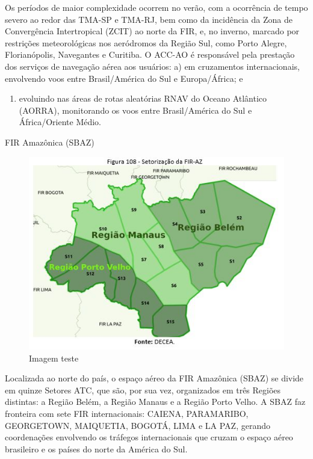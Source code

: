\documentclass[
]{book}
\providecommand{\tightlist}{%
  \setlength{\itemsep}{0pt}\setlength{\parskip}{0pt}}
\begin{document}
Os períodos de maior complexidade ocorrem no verão, com a ocorrência de tempo severo ao redor das TMA-SP e TMA-RJ, bem como da incidência da Zona de Convergência Intertropical (ZCIT) ao norte da FIR, e, no inverno, marcado por restrições meteorológicas nos aeródromos da Região Sul, como Porto Alegre, Florianópolis, Navegantes e Curitiba. O ACC-AO é responsável pela prestação dos serviços de navegação aérea aos usuários:
a) em cruzamentos internacionais, envolvendo voos entre Brasil/América do Sul e Europa/África; e

\begin{enumerate}
\def\labelenumi{\alph{enumi})}
\setcounter{enumi}{1}
\tightlist
\item
  evoluindo nas áreas de rotas aleatórias RNAV do Oceano Atlântico (AORRA), monitorando os voos entre Brasil/América do Sul e África/Oriente Médio.
\end{enumerate}

FIR Amazônica (SBAZ)

\begin{figure}
\centering
\includegraphics{imagens/fig100.jpg}
\caption{Imagem teste}
\end{figure}

Localizada ao norte do país, o espaço aéreo da FIR Amazônica (SBAZ) se divide em quinze Setores ATC, que são, por sua vez, organizados em três Regiões distintas: a Região Belém, a Região Manaus e a Região Porto Velho. A SBAZ faz fronteira com sete FIR internacionais: CAIENA, PARAMARIBO, GEORGETOWN, MAIQUETIA, BOGOTÁ, LIMA e LA PAZ, gerando coordenações envolvendo os tráfegos internacionais que cruzam o espaço aéreo brasileiro e os países do norte da América do Sul.
\end{document}

